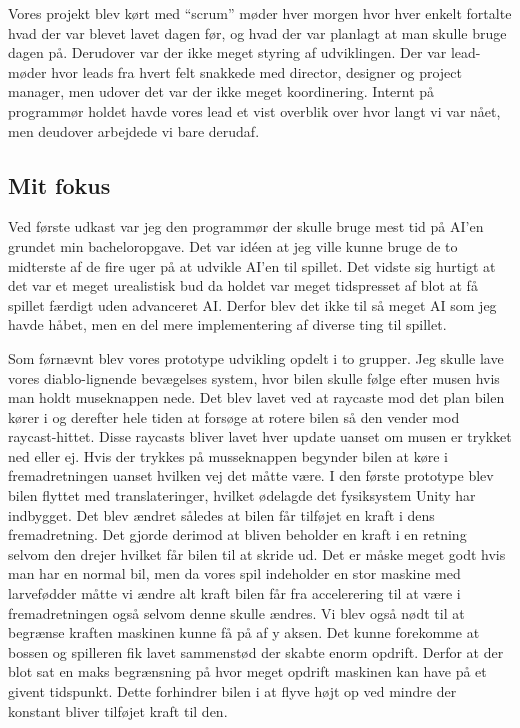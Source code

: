 Vores projekt blev kørt med ``scrum'' møder hver morgen hvor hver
enkelt fortalte hvad der var blevet lavet dagen før, og hvad der var
planlagt at man skulle bruge dagen på.  Derudover var der ikke meget
styring af udviklingen. Der var lead-møder hvor leads fra hvert felt
snakkede med director, designer og project manager, men udover det var
der ikke meget koordinering. Internt på programmør holdet havde vores
lead et vist overblik over hvor langt vi var nået, men deudover
arbejdede vi bare derudaf.




\subsection{Mit fokus} Ved første udkast var jeg den programmør der
skulle bruge mest tid på AI'en grundet min bacheloropgave. Det var
idéen at jeg ville kunne bruge de to midterste af de fire uger på at
udvikle AI'en til spillet. Det vidste sig hurtigt at det var et meget
urealistisk bud da holdet var meget tidspresset af blot at få spillet
færdigt uden advanceret AI. Derfor blev det ikke til så meget AI som
jeg havde håbet, men en del mere implementering af diverse ting til
spillet.

Som førnævnt blev vores prototype udvikling opdelt i to grupper. Jeg
skulle lave vores diablo-lignende bevægelses system, hvor bilen skulle
følge efter musen hvis man holdt museknappen nede. Det blev lavet ved
at raycaste mod det plan bilen kører i og derefter hele tiden at
forsøge at rotere bilen så den vender mod raycast-hittet. Disse
raycasts bliver lavet hver update uanset om musen er trykket ned eller
ej. Hvis der trykkes på musseknappen begynder bilen at køre i
fremadretningen uanset hvilken vej det måtte være. I den første
prototype blev bilen flyttet med translateringer, hvilket ødelagde det
fysiksystem Unity har indbygget. Det blev ændret således at bilen får
tilføjet en kraft i dens fremadretning. Det gjorde derimod at bliven
beholder en kraft i en retning selvom den drejer hvilket får bilen til
at skride ud. Det er måske meget godt hvis man har en normal bil, men
da vores spil indeholder en stor maskine med larvefødder måtte vi
ændre alt kraft bilen får fra accelerering til at være i
fremadretningen også selvom denne skulle ændres.  Vi blev også nødt
til at begrænse kraften maskinen kunne få på af y aksen. Det kunne
forekomme at bossen og spilleren fik lavet sammenstød der skabte enorm
opdrift. Derfor at der blot sat en maks begrænsning på hvor meget
opdrift maskinen kan have på et givent tidspunkt. Dette forhindrer
bilen i at flyve højt op ved mindre der konstant bliver tilføjet kraft
til den.

